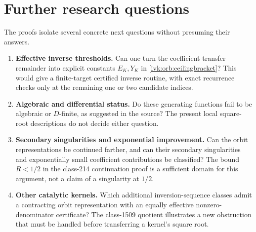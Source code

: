 \documentclass[11pt,letterpaper]{article}
\theoremstyle{remark}\newtheorem{remark}[theorem]{Remark}
\begin{document}
\section{Further research questions}\label{ivk:orb:sec:questions}
The proofs isolate several concrete next questions without presuming
their answers.
\begin{enumerate}[label=\arabic*.]
\item \textbf{Effective inverse thresholds.}
Can one turn the coefficient-transfer remainder into explicit constants
$E_K,Y_K$ in \eqref{ivk:orb:ceilingbracket}? This would give a finite-target
certified inverse routine, with exact recurrence checks only at the
remaining one or two candidate indices.
\item \textbf{Algebraic and differential status.}
Do these generating functions fail to be algebraic or $D$-finite, as
suggested in the source? The present local square-root descriptions
do not decide either question.
\item \textbf{Secondary singularities and exponential improvement.}
Can the orbit representations be continued farther, and can their
secondary singularities and exponentially small coefficient
contributions be classified? The bound $R<1/2$ in the class-214
continuation proof is a sufficient domain for this argument, not a
claim of a singularity at $1/2$.
\item \textbf{Other catalytic kernels.}
Which additional inversion-sequence classes admit a contracting
orbit representation with an equally effective nonzero-denominator
certificate? The class-1509 quotient illustrates a new obstruction
that must be handled before transferring a kernel's square root.
\end{enumerate}
\end{document}
